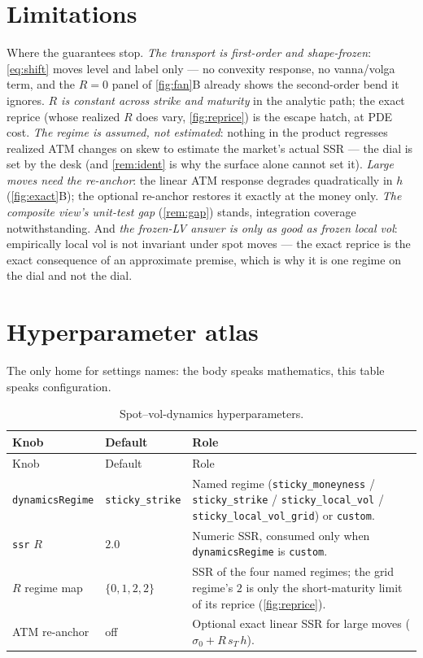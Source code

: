 \documentclass[11pt]{article}
\begin{document}
\section{Limitations}
\label{sec:limits}

Where the guarantees stop.  \emph{The transport is first-order and
shape-frozen}: \eqref{eq:shift} moves level and label only --- no
convexity response, no vanna/volga term, and the $R=0$ panel of
\cref{fig:fan}B already shows the second-order bend it ignores.
\emph{$R$ is constant across strike and maturity} in the analytic
path; the exact reprice (whose realized $R$ does vary,
\cref{fig:reprice}) is the escape hatch, at PDE cost.  \emph{The
regime is assumed, not estimated}: nothing in the product regresses
realized ATM changes on skew to estimate the market's actual SSR ---
the dial is set by the desk (and \cref{rem:ident} is why the surface
alone cannot set it).  \emph{Large moves need the re-anchor}: the
linear ATM response degrades quadratically in $h$
(\cref{fig:exact}B); the optional re-anchor restores it exactly at the
money only.  \emph{The composite view's unit-test gap}
(\cref{rem:gap}) stands, integration coverage notwithstanding.  And
\emph{the frozen-LV answer is only as good as frozen local vol}:
empirically local vol is not invariant under spot moves --- the exact
reprice is the exact consequence of an approximate premise, which is
why it is one regime on the dial and not the dial.

\appendix
\section{Hyperparameter atlas}
\label{app:atlas}

The only home for settings names: the body speaks mathematics, this
table speaks configuration.

\begin{longtable}{p{}p{}p{}}
\caption{Spot--vol-dynamics hyperparameters.}\label{tab:atlas}\\
\toprule Knob & Default & Role\\ \midrule
\endfirsthead \toprule Knob & Default & Role\\ \midrule \endhead
\texttt{dynamicsRegime} & \texttt{sticky\_strike} & Named regime
(\texttt{sticky\_moneyness} / \texttt{sticky\_strike} /
\texttt{sticky\_local\_vol} / \texttt{sticky\_local\_vol\_grid}) or
\texttt{custom}.\\
\texttt{ssr} $R$ & $2.0$ & Numeric SSR, consumed only when
\texttt{dynamicsRegime} is \texttt{custom}.\\
$R$ regime map & $\{0,1,2,2\}$ & SSR of the four named regimes; the
grid regime's $2$ is only the short-maturity limit of its reprice
(\cref{fig:reprice}).\\
ATM re-anchor & off & Optional exact linear SSR for large moves
($\sigma_0+R\,s_T\,h$).\\
\bottomrule
\end{longtable}
\end{document}
